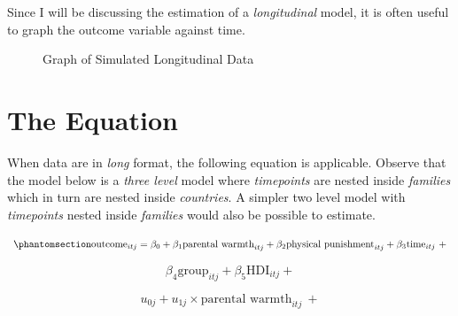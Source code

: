 \documentclass[
  letterpaper,
  DIV=11,
  numbers=noendperiod]{scrreprt}
\begin{document}
Since I will be discussing the estimation of a \emph{longitudinal}
model, it is often useful to graph the outcome variable against time.

\begin{figure}


\caption{\label{fig-data2}Graph of Simulated Longitudinal Data}

\end{figure}%

\section{The Equation}\label{the-equation-1}

When data are in \emph{long} format, the following equation is
applicable. Observe that the model below is a \emph{three level} model
where \emph{timepoints} are nested inside \emph{families} which in turn
are nested inside \emph{countries}. A simpler two level model with
\emph{timepoints} nested inside \emph{families} would also be possible
to estimate.

\begin{equation}\phantomsection\label{eq-MLM-longitudinal}{\text{outcome}_{itj} = \beta_0 + \beta_1 \text{parental warmth}_{itj} + \beta_2 \text{physical punishment}_{itj} + \beta_3 \text{time}_{itj} \ + }\end{equation}

\[\beta_4 \text{group}_{itj} + \beta_5 \text{HDI}_{itj} +\]

\[u_{0j} + u_{1j} \times \text{parental warmth}_{itj} \ + \]
\end{document}
